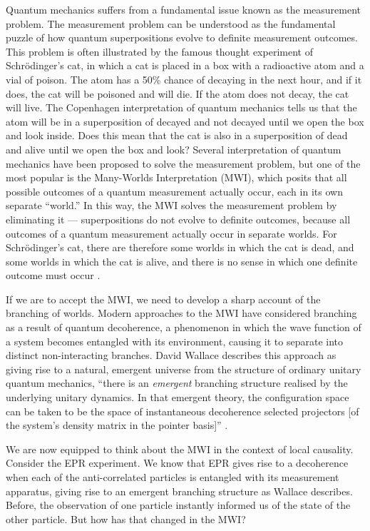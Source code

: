 Quantum mechanics suffers from a fundamental issue known as the measurement
problem. The measurement problem can be understood as the fundamental puzzle of
how quantum superpositions evolve to definite measurement outcomes. This 
problem is often illustrated by the famous thought experiment of Schrödinger's
cat, in which a cat is placed in a box with a radioactive atom and a vial of
poison. The atom has a 50\% chance of decaying in the next hour, and if it does,
the cat will be poisoned and will die. If the atom does not decay, the cat will
live. The Copenhagen interpretation of quantum mechanics tells us that the atom
will be in a superposition of decayed and not decayed until we open the box and
look inside. Does this mean that the cat is also in a superposition of dead
and alive until we open the box and look? Several interpretation of quantum
mechanics have been proposed to solve the measurement problem, but one of the
most popular is the Many-Worlds Interpretation (MWI), which posits that all
possible outcomes of a quantum measurement actually occur, each in its own
separate ``world.'' In this way, the MWI solves the measurement problem by 
eliminating it — superpositions do not evolve to definite outcomes, because all 
outcomes of a quantum measurement actually occur in separate worlds. For 
Schrödinger's cat, there are therefore some worlds in which the cat is dead, and
some worlds in which the cat is alive, and there is no sense in which one
definite outcome must occur \citep{Wallace_2012}.

If we are to accept the MWI, we need to develop a sharp account of the branching
of worlds. Modern approaches to the MWI have considered branching as a result of
quantum decoherence, a phenomenon in which the wave function of a system
becomes entangled with its environment, causing it to separate into distinct
non-interacting branches. David Wallace describes this approach as giving rise 
to a natural, emergent universe from the structure of ordinary unitary quantum 
mechanics, ``there is an \emph{emergent} branching structure realised by the 
underlying unitary dynamics. In that emergent theory, the configuration space
can be taken to be the space of instantaneous decoherence selected projectors
[of the system's density matrix in the pointer basis]'' \citep{Wallace_2012}.

We are now equipped to think about the MWI in the context of local causality.
Consider the EPR experiment. We know that EPR gives rise to a decoherence when 
each of the anti-correlated particles is entangled with its measurement
apparatus, giving rise to an emergent branching structure as Wallace describes.
Before, the observation of one particle instantly informed us of the state of
the other particle. But how has that changed in the MWI?

